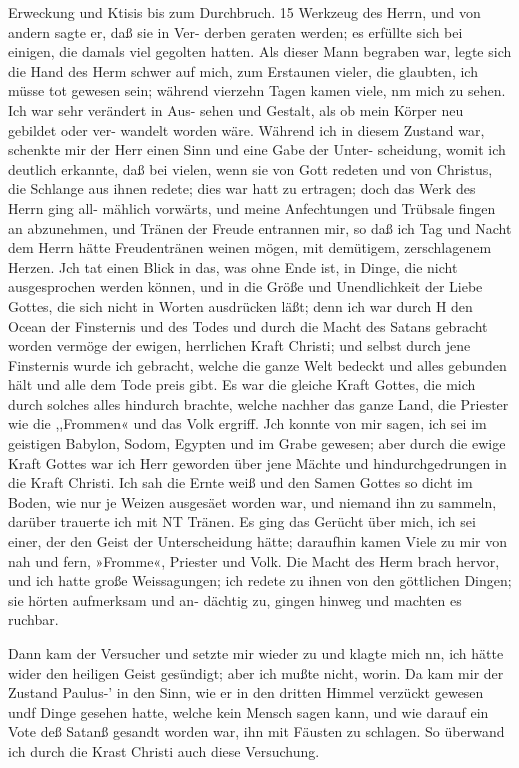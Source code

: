 Erweckung und Ktisis bis zum Durchbruch. 15
Werkzeug des Herrn, und von andern sagte er, daß sie in Ver-
derben geraten werden; es erfüllte sich bei einigen, die damals
viel gegolten hatten. Als dieser Mann begraben war, legte sich
die Hand des Herm schwer auf mich, zum Erstaunen vieler, die
glaubten, ich müsse tot gewesen sein; während vierzehn Tagen
kamen viele, nm mich zu sehen. Ich war sehr verändert in Aus-
sehen und Gestalt, als ob mein Körper neu gebildet oder ver-
wandelt worden wäre. Während ich in diesem Zustand war,
schenkte mir der Herr einen Sinn und eine Gabe der Unter-
scheidung, womit ich deutlich erkannte, daß bei vielen, wenn sie
von Gott redeten und von Christus, die Schlange aus ihnen redete;
dies war hatt zu ertragen; doch das Werk des Herrn ging all-
mählich vorwärts, und meine Anfechtungen und Trübsale fingen
an abzunehmen, und Tränen der Freude entrannen mir, so daß
ich Tag und Nacht dem Herrn hätte Freudentränen weinen mögen,
mit demütigem, zerschlagenem Herzen. Jch tat einen Blick in das,
was ohne Ende ist, in Dinge, die nicht ausgesprochen werden
können, und in die Größe und Unendlichkeit der Liebe Gottes,
die sich nicht in Worten ausdrücken läßt; denn ich war durch H
den Ocean der Finsternis und des Todes und durch die Macht
des Satans gebracht worden vermöge der ewigen, herrlichen Kraft
Christi; und selbst durch jene Finsternis wurde ich gebracht, welche
die ganze Welt bedeckt und alles gebunden hält und alle dem Tode
preis gibt. Es war die gleiche Kraft Gottes, die mich durch
solches alles hindurch brachte, welche nachher das ganze Land,
die Priester wie die ,,Frommen« und das Volk ergriff.
Jch konnte von mir sagen, ich sei im geistigen Babylon, Sodom,
Egypten und im Grabe gewesen; aber durch die ewige Kraft Gottes
war ich Herr geworden über jene Mächte und hindurchgedrungen
in die Kraft Christi. Ich sah die Ernte weiß und den Samen
Gottes so dicht im Boden, wie nur je Weizen ausgesäet worden
war, und niemand ihn zu sammeln, darüber trauerte ich mit NT
Tränen.
Es ging das Gerücht über mich, ich sei einer, der den Geist
der Unterscheidung hätte; daraufhin kamen Viele zu mir von nah
und fern, »Fromme«, Priester und Volk. Die Macht des Herm
brach hervor, und ich hatte große Weissagungen; ich redete zu
ihnen von den göttlichen Dingen; sie hörten aufmerksam und an-
dächtig zu, gingen hinweg und machten es ruchbar.


Dann kam der Versucher und setzte mir wieder zu und
klagte mich nn, ich hätte wider den heiligen Geist gesündigt; aber
ich mußte nicht, worin. Da kam mir der Zustand Paulus-’ in
den Sinn, wie er in den dritten Himmel verzückt gewesen undf
Dinge gesehen hatte, welche kein Mensch sagen kann, und wie
darauf ein Vote deß Satanß gesandt worden war, ihn mit
Fäusten zu schlagen. So überwand ich durch die Krast Christi
auch diese Versuchung.


